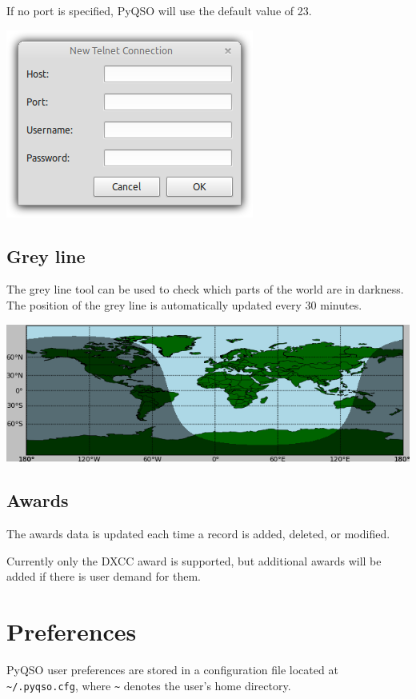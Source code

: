 \documentclass[11pt, a4paper]{report}
\begin{document}

If no port is specified, PyQSO will use the default value of 23.

\begin{center}
  \includegraphics[width=0.5\columnwidth]{images/telnet_connection_dialog.png}
\end{center}

\section{Grey line}
The grey line tool can be used to check which parts of the world are in darkness. The position of the grey line is automatically updated every 30 minutes.

\begin{center}
  \includegraphics[width=1\columnwidth]{images/grey_line.png}
\end{center}

\section{Awards}
The awards data is updated each time a record is added, deleted, or modified. 

Currently only the DXCC award is supported, but additional awards will be added if there is user demand for them.

\chapter{Preferences}\label{chap:preferences}
PyQSO user preferences are stored in a configuration file located at \texttt{\textasciitilde/.pyqso.cfg}, where \texttt{\textasciitilde} denotes the user's home directory.
\end{document}
